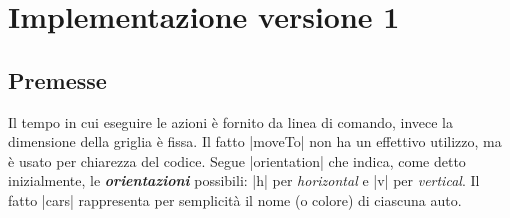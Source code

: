 \documentclass[10pt, a4paper, oneside]{article}
\begin{document}








\newpage
\section{Implementazione versione 1}

\subsection{Premesse}
Il tempo in cui eseguire le azioni è fornito da linea di comando, invece la dimensione della griglia è fissa. Il fatto |moveTo| non ha un effettivo utilizzo, ma è usato per chiarezza del codice. Segue |orientation| che indica, come detto inizialmente, le \emph{\textbf{orientazioni}} possibili: |h| per \emph{horizontal} e |v| per \emph{vertical}. Il fatto |cars| rappresenta per semplicità il nome (o colore) di ciascuna auto. \\
\end{document}
